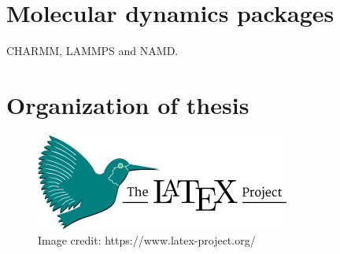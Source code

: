\graphicspath{{figures/1/}}

\section{Molecular dynamics packages}
CHARMM\citep{brooks1983charmm}, LAMMPS\citep{plimpton1995fast} and NAMD\citep{phillips2005scalable}.

\section{Organization of thesis}
\begin{figure}[H]
\centering
	\includegraphics[width=\textwidth]{latex-logo.png}
    \caption[latex logo]{Image credit: https://www.latex-project.org/}
    \label{latex-logo}
\end{figure}
